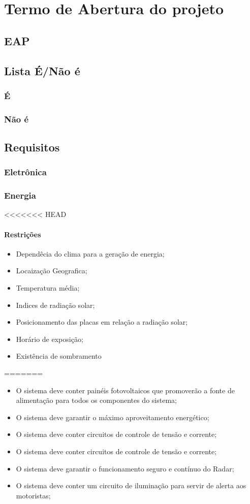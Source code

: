 \chapter{Termo de Abertura do projeto}

\section{EAP}
\section{Lista É/Não é}
\subsection{É}
\subsection{Não é}
\section{Requisitos}
\subsection{Eletrônica}
\subsection{Energia}
<<<<<<< HEAD
\subsubsection{Restrições}
\begin{itemize}
   \item Dependêcia do clima para a geração de energia;
   \item Locaização Geografica;
   \item Temperatura média;
   \item Indices de radiação solar;
   \item Posicionamento das placas em relação a radiação solar;
   \item Horário de exposição;
   \item Existência de sombramento
 \end{itemize}
=======
\begin{itemize}
	\item O sistema deve conter painéis fotovoltaicos que promoverão a fonte de alimentação para todos os componentes do sistema;
	\item O sistema deve garantir o máximo aproveitamento energético;
	\item O sistema deve conter circuitos de controle de tensão e corrente;
	\item O sistema deve conter circuitos de controle de tensão e corrente;
	\item O sistema deve garantir o funcionamento seguro e contínuo do Radar;
	\item O sistema deve conter um circuito de iluminação para servir de alerta aos motoristas;
	\end{itemize}

